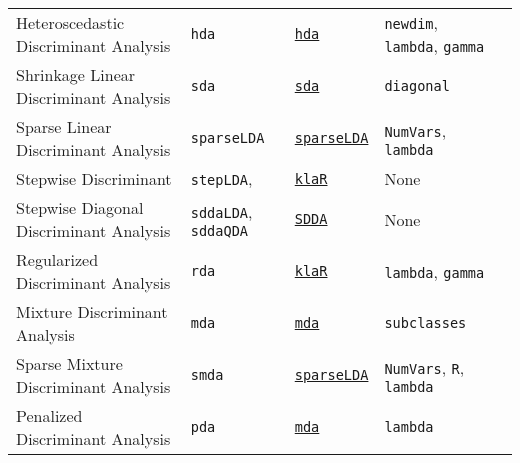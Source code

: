 \documentclass[12pt]{article}
\begin{document}
\begin{landscape}
\begin{longtable}{lllll}
      Heteroscedastic Discriminant Analysis&
         \texttt{hda} & 
              {\tt \href{http://cran.r-project.org/web/packages/hda/index.html}{hda}}      &          
            \texttt{newdim}, \texttt{lambda}, \texttt{gamma}\\  
            
\rowcolor[rgb]{.95, .95, .95}                     
      Shrinkage Linear Discriminant Analysis &
         \texttt{sda} & 
              {\tt \href{http://cran.r-project.org/web/packages/sda/index.html}{sda}}      &          
            \texttt{diagonal}\\  
      
      Sparse Linear Discriminant Analysis&
         \texttt{sparseLDA} & 
              {\tt \href{http://cran.r-project.org/web/packages/sparseLDA/index.html}{sparseLDA}}      &          
            \texttt{NumVars}, \texttt{lambda} \\  

\rowcolor[rgb]{.95, .95, .95}               
       Stepwise Discriminant&
        \texttt{stepLDA}, &
         {\tt \href{http://cran.r-project.org/web/packages/klaR/index.html}{klaR}}   &
        None \\
      
      Stepwise Diagonal Discriminant Analysis&
        \texttt{sddaLDA}, \texttt{sddaQDA}&
         {\tt \href{http://cran.r-project.org/web/packages/SDDA/index.html}{SDDA}}&
        None \\
            
\rowcolor[rgb]{.95, .95, .95}                     
      Regularized Discriminant Analysis &
         \texttt{rda} & 
             {\tt \href{http://cran.r-project.org/web/packages/klaR/index.html}{klaR}}      & 
            \texttt{lambda}, \texttt{gamma} & \\
      
      Mixture Discriminant Analysis &
         \texttt{mda} & 
             {\tt \href{http://cran.r-project.org/web/packages/mda/index.html}{mda}}        & 
            \texttt{subclasses} & \\

\rowcolor[rgb]{.95, .95, .95}         
      Sparse Mixture Discriminant Analysis&
         \texttt{smda} & 
             {\tt \href{http://cran.r-project.org/web/packages/sparseLDA/index.html}{sparseLDA}}        &          
            \texttt{NumVars}, \texttt{R}, \texttt{lambda} \\  
      
      Penalized Discriminant Analysis &
         \texttt{pda} & 
             {\tt \href{http://cran.r-project.org/web/packages/mda/index.html}{mda}}      & 
            \texttt{lambda} & \\
 

\end{longtable}
\end{landscape}
\end{document}
